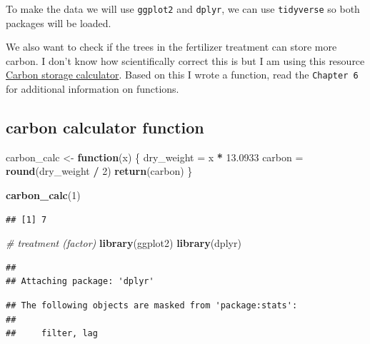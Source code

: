 \documentclass[
]{book}
\newenvironment{Shaded}{\begin{snugshade}}{\end{snugshade}}
\newcommand{\CommentTok}[1]{\textcolor[rgb]{0.56,0.35,0.01}{\textit{#1}}}
\newcommand{\ControlFlowTok}[1]{\textcolor[rgb]{0.13,0.29,0.53}{\textbf{#1}}}
\newcommand{\DecValTok}[1]{\textcolor[rgb]{0.00,0.00,0.81}{#1}}
\newcommand{\FloatTok}[1]{\textcolor[rgb]{0.00,0.00,0.81}{#1}}
\newcommand{\FunctionTok}[1]{\textcolor[rgb]{0.13,0.29,0.53}{\textbf{#1}}}
\newcommand{\NormalTok}[1]{#1}
\newcommand{\OtherTok}[1]{\textcolor[rgb]{0.56,0.35,0.01}{#1}}
\newcommand{\SpecialCharTok}[1]{\textcolor[rgb]{0.81,0.36,0.00}{\textbf{#1}}}
\begin{document}
To make the data we will use \texttt{ggplot2} and \texttt{dplyr}, we can use \texttt{tidyverse} so both packages will be loaded.

We also want to check if the trees in the fertilizer treatment can store more carbon. I don't know how scientifically correct this is but I am using this resource \href{https://naturalresources.wales/media/687190/eng-worksheet-carbon-storage-calculator.pdf}{Carbon storage calculator}. Based on this I wrote a function, read the \texttt{Chapter\ 6} for additional information on functions.

\hypertarget{carbon-calculator-function}{%
\subsection{carbon calculator function}\label{carbon-calculator-function}}

\begin{Shaded}
\begin{Highlighting}[]
\NormalTok{carbon\_calc }\OtherTok{\textless{}{-}} \ControlFlowTok{function}\NormalTok{(x) \{}
\NormalTok{  dry\_weight }\OtherTok{=}\NormalTok{ x }\SpecialCharTok{*} \FloatTok{13.0933}
\NormalTok{  carbon }\OtherTok{=} \FunctionTok{round}\NormalTok{(dry\_weight }\SpecialCharTok{/} \DecValTok{2}\NormalTok{)}
  \FunctionTok{return}\NormalTok{(carbon)}
\NormalTok{\}}

\FunctionTok{carbon\_calc}\NormalTok{(}\DecValTok{1}\NormalTok{)}
\end{Highlighting}
\end{Shaded}

\begin{verbatim}
## [1] 7
\end{verbatim}

\begin{Shaded}
\begin{Highlighting}[]
\CommentTok{\# treatment (factor)}
\FunctionTok{library}\NormalTok{(ggplot2)}
\FunctionTok{library}\NormalTok{(dplyr)}
\end{Highlighting}
\end{Shaded}

\begin{verbatim}
## 
## Attaching package: 'dplyr'
\end{verbatim}

\begin{verbatim}
## The following objects are masked from 'package:stats':
## 
##     filter, lag
\end{verbatim}
\end{document}
